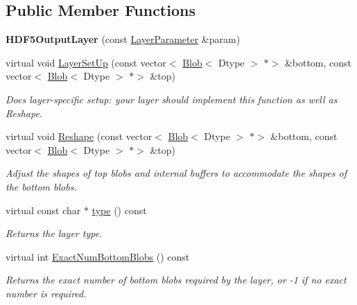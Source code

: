 \subsection*{Public Member Functions}
\begin{DoxyCompactItemize}
\item 
\mbox{\label{classcaffe_1_1_h_d_f5_output_layer_acf9e02d15a72cb6838e8fd2860e046b5}} 
{\bfseries H\+D\+F5\+Output\+Layer} (const \mbox{\hyperlink{classcaffe_1_1_layer_parameter}{Layer\+Parameter}} \&param)
\item 
virtual void \mbox{\hyperlink{classcaffe_1_1_h_d_f5_output_layer_aed2dea5250c86c46dd866fbb241dd9f6}{Layer\+Set\+Up}} (const vector$<$ \mbox{\hyperlink{classcaffe_1_1_blob}{Blob}}$<$ Dtype $>$ $\ast$$>$ \&bottom, const vector$<$ \mbox{\hyperlink{classcaffe_1_1_blob}{Blob}}$<$ Dtype $>$ $\ast$$>$ \&top)
\begin{DoxyCompactList}\small\item\em Does layer-\/specific setup\+: your layer should implement this function as well as Reshape. \end{DoxyCompactList}\item 
virtual void \mbox{\hyperlink{classcaffe_1_1_h_d_f5_output_layer_afaed17dc14251e627764334d54e55c4d}{Reshape}} (const vector$<$ \mbox{\hyperlink{classcaffe_1_1_blob}{Blob}}$<$ Dtype $>$ $\ast$$>$ \&bottom, const vector$<$ \mbox{\hyperlink{classcaffe_1_1_blob}{Blob}}$<$ Dtype $>$ $\ast$$>$ \&top)
\begin{DoxyCompactList}\small\item\em Adjust the shapes of top blobs and internal buffers to accommodate the shapes of the bottom blobs. \end{DoxyCompactList}\item 
\mbox{\label{classcaffe_1_1_h_d_f5_output_layer_aebde1cfc48583ce0d2e85ea0542a7077}} 
virtual const char $\ast$ \mbox{\hyperlink{classcaffe_1_1_h_d_f5_output_layer_aebde1cfc48583ce0d2e85ea0542a7077}{type}} () const
\begin{DoxyCompactList}\small\item\em Returns the layer type. \end{DoxyCompactList}\item 
virtual int \mbox{\hyperlink{classcaffe_1_1_h_d_f5_output_layer_a92fb5561414d7e8b8845b0279b1ee847}{Exact\+Num\+Bottom\+Blobs}} () const
\begin{DoxyCompactList}\small\item\em Returns the exact number of bottom blobs required by the layer, or -\/1 if no exact number is required. \end{DoxyCompactList}\item 

\end{DoxyCompactItemize}
